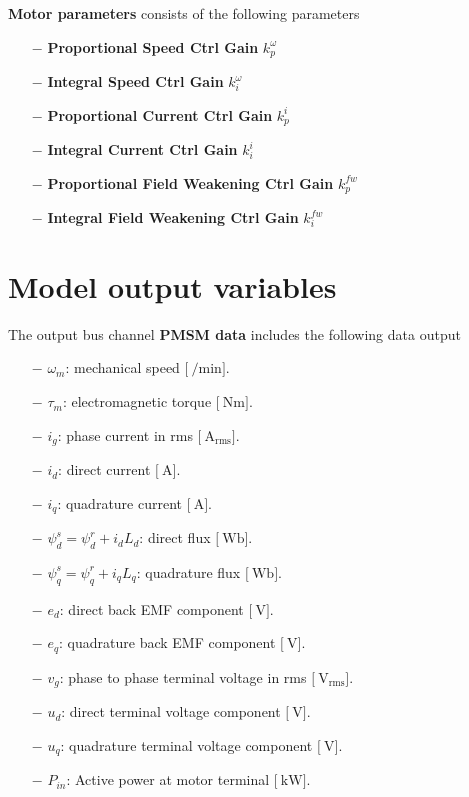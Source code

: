 \documentclass[11pt,a4paper]{article}
\numberwithin{equation}{section}
\theoremstyle{it}
\theoremstyle{definition}
\begin{document}
\begin{onehalfspace}
\textbf{Motor parameters} consists of the following parameters
\begin{itemize}
	\item[$-$] \textbf{Proportional Speed Ctrl Gain} $k_p^\omega$
	\item[$-$] \textbf{Integral Speed Ctrl Gain} $k_i^\omega$
	\item[$-$] \textbf{Proportional Current Ctrl Gain} $k_p^i$
	\item[$-$] \textbf{Integral Current Ctrl Gain} $k_i^i$
	\item[$-$] \textbf{Proportional Field Weakening Ctrl Gain} $k_p^{fw}$
	\item[$-$] \textbf{Integral Field Weakening Ctrl Gain} $k_i^{fw}$
\end{itemize}

\section{Model output variables}
The output bus channel \textbf{PMSM data} includes the following data output
\begin{itemize}
	\item[$-$] $\omega_m$: mechanical speed $\Big[\SI{}{\per\minute}\Big]$.
	\item[$-$] $\tau_m$: electromagnetic torque $\Big[\SI{}{\newton\meter}\Big]$.
	\item[$-$] $i_g$: phase current in rms $\Big[\SI{}{\ampere_\text{rms}}\Big]$.	
	\item[$-$] $i_d$: direct current $\Big[\SI{}{\ampere}\Big]$.	
	\item[$-$] $i_q$: quadrature current $\Big[\SI{}{\ampere}\Big]$.
	\item[$-$] $\psi_d^s=\psi_d^r+i_dL_d$: direct flux $\Big[\SI{}{\weber}\Big]$.	
	\item[$-$] $\psi_q^s=\psi_q^r+i_qL_q$: quadrature flux $\Big[\SI{}{\weber}\Big]$.	
	\item[$-$] $e_d$: direct back EMF component $\Big[\SI{}{\volt}\Big]$.	
	\item[$-$] $e_q$: quadrature back EMF component $\Big[\SI{}{\volt}\Big]$.
	\item[$-$] $v_g$: phase to phase terminal voltage in rms $\Big[\SI{}{\volt_\text{rms}}\Big]$.		
	\item[$-$] $u_d$: direct terminal voltage component $\Big[\SI{}{\volt}\Big]$.	
	\item[$-$] $u_q$: quadrature terminal voltage component $\Big[\SI{}{\volt}\Big]$.
	\item[$-$] $P_{in}$: Active power at motor terminal $\Big[\SI{}{\kilo\watt}\Big]$.	
\end{itemize}


\end{onehalfspace}
\end{document}

